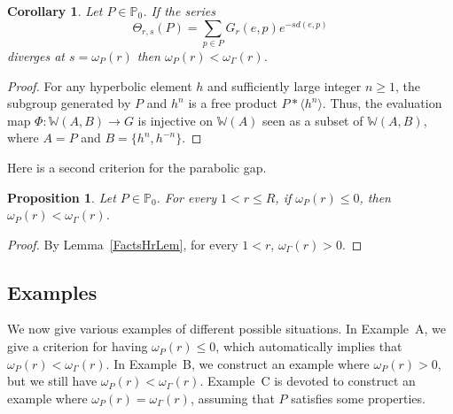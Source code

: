 \documentclass{amsart}
\newtheorem{prop}[thm]{Proposition}
\newtheorem{cor}[thm]{Corollary}
\theoremstyle{definition}
\theoremstyle{remark}
\newtheorem{rem}[thm]{Remark}
\begin{document}
\begin{cor}\label{parabolicdivergentgrowthgap}
Let $P\in \mathbb{P}_0$. 
If the series $$\Theta_{r,s}(P)=\sum_{p\in P} G_r(e,p) e^{-s d(e,p)} $$ diverges at $s=\omega_P(r)$ then $\omega_P(r)<\omega_\Gamma(r)$.
\end{cor}
\begin{proof} 
For any hyperbolic element $h$ and sufficiently large  integer $n\ge 1$, the subgroup generated by $P$ and $h^n$ is a free product $P* \langle h^n\rangle$. 
Thus, the evaluation map $\Phi: \mathbb W(A, B) \to G$ is injective on $\mathbb W(A)$ seen as a subset of $\mathbb W(A,B)$, where $A=P$ and $B=\{h^n,h^{-n}\}$.
\end{proof}


Here is a second criterion for the parabolic gap.

\begin{prop}\label{secondcriterionparabolicgap}
Let $P\in \mathbb P_0$.
For every $1<r\leq R$, if $\omega_P(r)\leq 0$, then $\omega_P(r)<\omega_\Gamma(r)$.
\end{prop}

\begin{proof}
By Lemma~\ref{FactsHrLem}, for every $1<r$, $\omega_\Gamma(r)>0$.
\end{proof}

\subsection{Examples}\label{sectionexamples}
We now give various examples of different possible situations.
In Example~A, we give a criterion for having $\omega_P(r)\leq 0$, which automatically implies that $\omega_P(r)<\omega_\Gamma(r)$.
In Example~B, we construct an example where $\omega_P(r)>0$, but we still have $\omega_P(r)<\omega_\Gamma(r)$.
Example~C is devoted to construct an example where $\omega_P(r)=\omega_\Gamma(r)$, assuming that $P$ satisfies some properties.
\end{document}
